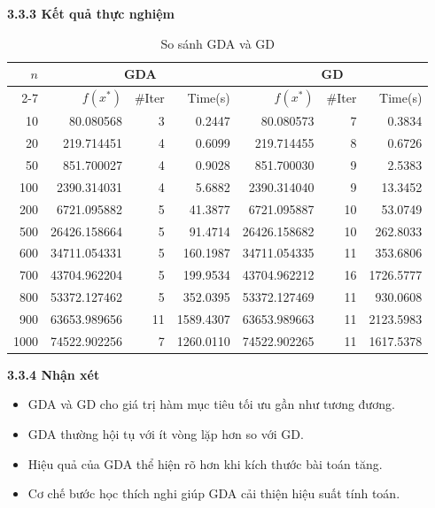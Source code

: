\begin{frame}{\textbf{\large 3.3.3 Kết quả thực nghiệm}}
\vspace*{-1cm}
\scriptsize
\begin{table}
\centering
\begin{tabular}{|r|rrr||rrr|}
\hline
$n$ & \multicolumn{3}{c||}{GDA} & \multicolumn{3}{c|}{GD} \\ \cline{2-7}
 & $f(x^*)$ & \#Iter & Time(s)
 & $f(x^*)$ & \#Iter & Time(s) \\
\hline
10   & 80.080568   & 3  & 0.2447  & 80.080573   & 7  & 0.3834  \\
20   & 219.714451  & 4  & 0.6099  & 219.714455  & 8  & 0.6726  \\
50   & 851.700027  & 4  & 0.9028  & 851.700030  & 9  & 2.5383  \\
100  & 2390.314031 & 4  & 5.6882  & 2390.314040 & 9  & 13.3452 \\
200  & 6721.095882 & 5  & 41.3877 & 6721.095887 & 10 & 53.0749 \\
500  & 26426.158664& 5  & 91.4714 & 26426.158682& 10 & 262.8033\\
600  & 34711.054331& 5  & 160.1987& 34711.054335& 11 & 353.6806\\
700  & 43704.962204& 5  & 199.9534& 43704.962212& 16 & 1726.5777\\
800  & 53372.127462& 5  & 352.0395& 53372.127469& 11 & 930.0608\\
900  & 63653.989656& 11 & 1589.4307& 63653.989663& 11 & 2123.5983\\
1000 & 74522.902256& 7  & 1260.0110& 74522.902265& 11 & 1617.5378\\
\hline
\end{tabular}
\caption{So sánh GDA và GD}
\end{table}
\end{frame}

\begin{frame}{\textbf{\large 3.3.4 Nhận xét}}
\vspace*{-1cm}
\begin{itemize}
    \item GDA và GD cho giá trị hàm mục tiêu tối ưu gần như tương đương.
    \item GDA thường hội tụ với ít vòng lặp hơn so với GD.
    \item Hiệu quả của GDA thể hiện rõ hơn khi kích thước bài toán tăng.
    \item Cơ chế bước học thích nghi giúp GDA cải thiện hiệu suất tính toán.
\end{itemize}
\end{frame}




